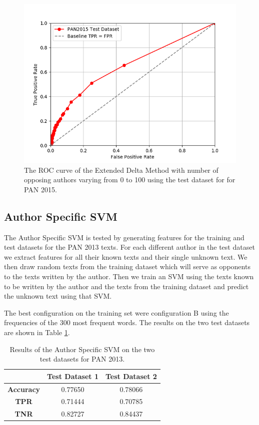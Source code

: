 \begin{figure}
    \centering
    \includegraphics[width=.7\textwidth]{./pictures/extended_delta_method_roc.png}
    \caption{The ROC curve of the Extended Delta Method with number of opposing
    authors varying from 0 to 100 using the test dataset for for PAN 2015.}
    \label{fig:extended_delta_method_roc}
\end{figure}

\subsection{Author Specific SVM} \label{subsec:results:author_specific_svm}
The Author Specific SVM is tested by generating features for the training and
test datasets for the PAN 2013 texts. For each different author in the test
dataset we extract features for all their known texts and their single unknown
text. We then draw random texts from the training dataset which will serve as
opponents to the texts written by the author. Then we train an SVM using the
texts known to be written by the author and the texts from the training dataset
and predict the unknown text using that SVM.

The best configuration on the training set were configuration B using the
frequencies of the 300 most frequent words. The results on the two test datasets
are shown in Table \ref{table:svm_results}.

\begin{table}
    \centering
    \begin{tabular}{c|cc}
        & \textbf{Test Dataset 1} & \textbf{Test Dataset 2} \\
        \hline
        \textbf{Accuracy}  & 0.77650 & 0.78066 \\
        \textbf{\gls{TPR}} & 0.71444 & 0.70785 \\
        \textbf{\gls{TNR}} & 0.82727 & 0.84437
    \end{tabular}
    \caption{Results of the Author Specific SVM on the two test datasets for PAN
    2013.}
    \label{table:svm_results}
\end{table}
